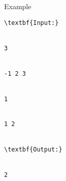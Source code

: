 Example
\begin{verbatim}
\textbf{Input:}


3


-1 2 3


1


1 2


\textbf{Output:}


2


\end{verbatim}